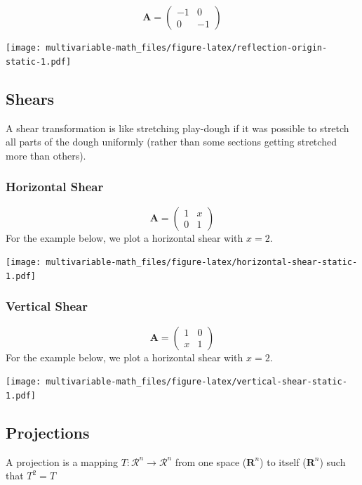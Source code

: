 \documentclass[
]{book}
\theoremstyle{definition}
\theoremstyle{definition}
\theoremstyle{definition}
\theoremstyle{remark}
\begin{document}
\[
\mathbf{A} = \begin{pmatrix}
-1 & 0 \\
0 & -1
\end{pmatrix}
\]

\texttt{[image: multivariable-math\_files/figure-latex/reflection-origin-static-1.pdf]}

\hypertarget{shears}{%
\subsection{Shears}\label{shears}}

A shear transformation is like stretching play-dough if it was possible to stretch all parts of the dough uniformly (rather than some sections getting stretched more than others).

\hypertarget{horizontal-shear}{%
\subsubsection{Horizontal Shear}\label{horizontal-shear}}

\[
\mathbf{A} = \begin{pmatrix}
1 & x \\
0 & 1
\end{pmatrix}
\]
For the example below, we plot a horizontal shear with \(x = 2\).

\texttt{[image: multivariable-math\_files/figure-latex/horizontal-shear-static-1.pdf]}

\hypertarget{vertical-shear}{%
\subsubsection{Vertical Shear}\label{vertical-shear}}

\[
\mathbf{A} = \begin{pmatrix}
1 & 0 \\
x & 1
\end{pmatrix}
\]
For the example below, we plot a horizontal shear with \(x = 2\).

\texttt{[image: multivariable-math\_files/figure-latex/vertical-shear-static-1.pdf]}

\hypertarget{projections}{%
\subsection{Projections}\label{projections}}

A projection is a mapping \(T:\mathcal{R}^n \rightarrow \mathcal{R}^n\) from one space (\(\mathbf{R}^n\)) to itself (\(\mathbf{R}^n\)) such that \(T^2 = T\)
\end{document}
